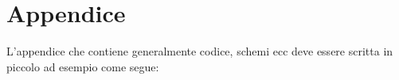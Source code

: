 \chapter{Appendice}
\label{chap:appendice}

L'appendice che contiene generalmente codice, schemi ecc deve essere scritta in piccolo ad esempio come segue:

\begin{tiny}
\lipsum[1]
\lipsum[2]
\lipsum[3]
\end{tiny}